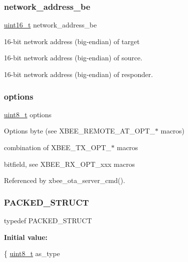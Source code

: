 \subsubsection{\texorpdfstring{network\+\_\+address\+\_\+be}{network\_address\_be}}
{\footnotesize\ttfamily \hyperlink{group__hal__dos_ga5a8b2dc9e45a9ee81a94ef304fb62505}{uint16\+\_\+t} network\+\_\+address\+\_\+be}



16-\/bit network address (big-\/endian) of target 

16-\/bit network address (big-\/endian) of source.

16-\/bit network address (big-\/endian) of responder. \mbox{\label{group__xbee__atcmd_gaace3d640c8d449b8db1162993d259d3f}} 
\subsubsection{\texorpdfstring{options}{options}}
{\footnotesize\ttfamily \hyperlink{group__hal__dos_gae1affc9ca37cfb624959c866a73f83c2}{uint8\+\_\+t} options}



Options byte (see X\+B\+E\+E\+\_\+\+R\+E\+M\+O\+T\+E\+\_\+\+A\+T\+\_\+\+O\+P\+T\+\_\+$\ast$ macros) 

combination of X\+B\+E\+E\+\_\+\+T\+X\+\_\+\+O\+P\+T\+\_\+$\ast$ macros

bitfield, see X\+B\+E\+E\+\_\+\+R\+X\+\_\+\+O\+P\+T\+\_\+xxx macros 

Referenced by xbee\+\_\+ota\+\_\+server\+\_\+cmd().

\mbox{\label{group__xbee__atcmd_ga4233297bd31be5c273d4fb0758cc54d7}} 
\subsubsection{\texorpdfstring{P\+A\+C\+K\+E\+D\+\_\+\+S\+T\+R\+U\+CT}{PACKED\_STRUCT}}
{\footnotesize\ttfamily typedef P\+A\+C\+K\+E\+D\+\_\+\+S\+T\+R\+U\+CT}

{\bfseries Initial value\+:}
\begin{DoxyCode}
\{
   \hyperlink{group__hal__dos_gae1affc9ca37cfb624959c866a73f83c2}{uint8\_t} as\_type
\end{DoxyCode}
\mbox{\label{group__xbee__atcmd_gade818037fd6c985038ff29656089758d}} 
